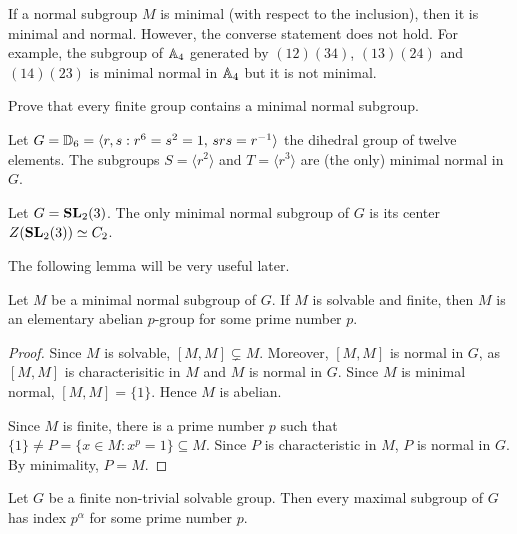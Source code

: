 \begin{example}
    If a normal subgroup $M$ is minimal (with respect to the inclusion), 
    then it is minimal and normal. However, 
    the converse statement does not hold. For example, the subgroup
    of $\mathbb{A}_4$ generated by $(12)(34)$, $(13)(24)$ and $(14)(23)$ is minimal normal in $\mathbb{A}_4$ 
    but it is not minimal. 
\end{example}

\begin{exercise}
Prove that every finite group contains a minimal normal subgroup. 
\end{exercise}

\begin{example}
    Let $G=\mathbb{D}_{6}=\langle r,s:r^6=s^2=1,\,srs=r^{-1}\rangle$ the dihedral group of twelve elements. The subgroups
    $S=\langle r^2\rangle$ 
    and $T=\langle r^3\rangle$ are (the only) minimal normal in $G$.
\end{example}

\begin{example}
    Let $G=\mathbf{SL}_2(3)$. The only minimal normal subgroup of $G$ is its center
    $Z(\mathbf{SL}_2(3))\simeq C_2$.
\end{example}


The following lemma will be very useful later. 

\begin{lemma}
\label{lem:minimal_normal}
Let $M$ be a minimal normal subgroup of $G$. If $M$ is solvable and finite, 
then $M$ is an elementary abelian $p$-group for some prime number $p$. 
\end{lemma}

\begin{proof}
Since $M$ is solvable, $[M,M]\subsetneq M$. Moreover, $[M,M]$ is normal in $G$, as
$[M,M]$ is characterisitic in $M$ and $M$ is normal in $G$. Since $M$ is minimal normal, 
$[M,M]=\{1\}$. Hence $M$ is abelian. 
	
Since $M$ is finite, there is a prime number $p$ such that $\{1\}\ne P=\{x\in
M:x^p=1\}\subseteq M$.  Since $P$ is characteristic in $M$, $P$ is normal in 
$G$. By minimality, $P=M$.
\end{proof}

\begin{theorem}
	Let $G$ be a finite non-trivial solvable group. Then 
		every maximal subgroup of $G$ has index $p^\alpha$ for some prime number $p$. 
\end{theorem}

